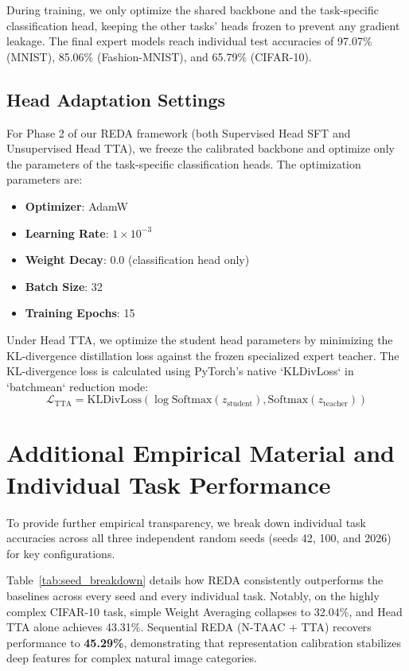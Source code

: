 \documentclass{article}
\theoremstyle{plain}
\theoremstyle{definition}
\theoremstyle{remark}
\begin{document}
During training, we only optimize the shared backbone and the task-specific classification head, keeping the other tasks' heads frozen to prevent any gradient leakage. The final expert models reach individual test accuracies of 97.07\% (MNIST), 85.06\% (Fashion-MNIST), and 65.79\% (CIFAR-10).

\subsection{Head Adaptation Settings}
For Phase 2 of our REDA framework (both Supervised Head SFT and Unsupervised Head TTA), we freeze the calibrated backbone and optimize only the parameters of the task-specific classification heads. 
The optimization parameters are:
\begin{itemize}
    \item \textbf{Optimizer}: AdamW \cite{loshchilov2017decoupled}
    \item \textbf{Learning Rate}: $1 \times 10^{-3}$
    \item \textbf{Weight Decay}: 0.0 (classification head only)
    \item \textbf{Batch Size}: 32
    \item \textbf{Training Epochs}: 15
\end{itemize}

Under Head TTA, we optimize the student head parameters by minimizing the KL-divergence distillation loss against the frozen specialized expert teacher. The KL-divergence loss is calculated using PyTorch's native `KLDivLoss` in `batchmean` reduction mode:
\begin{equation}
    \mathcal{L}_{\text{TTA}} = \text{KLDivLoss}\left( \log\text{Softmax}(z_{\text{student}}), \text{Softmax}(z_{\text{teacher}}) \right)
\end{equation}

\section{Additional Empirical Material and Individual Task Performance}
\label{app:individual_tasks}

To provide further empirical transparency, we break down individual task accuracies across all three independent random seeds (seeds 42, 100, and 2026) for key configurations. 

Table~\ref{tab:seed_breakdown} details how REDA consistently outperforms the baselines across every seed and every individual task. Notably, on the highly complex CIFAR-10 task, simple Weight Averaging collapses to 32.04\%, and Head TTA alone achieves 43.31\%. Sequential REDA (N-TAAC + TTA) recovers performance to \textbf{45.29\%}, demonstrating that representation calibration stabilizes deep features for complex natural image categories.
\end{document}
